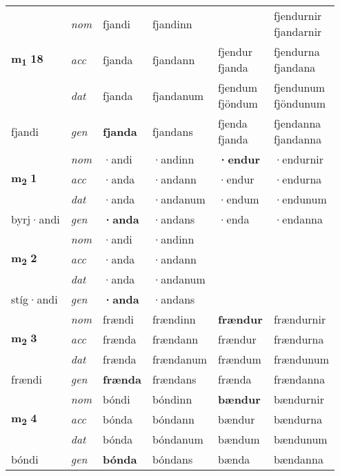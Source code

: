 \begin{longtable}[l]{X>{\footnotesize\itshape}XXXXX}
\multirow{3}{*}{{{\textbf{m{\textsubscript{1}}} \Large{\textbf{18}}}}} & nom & fjandi & fjandinn & \textbf{\specialcell{fjendur\\ fjandar}} & \specialcell{fjendurnir\\ fjandarnir} \\*
 & acc & fjanda & fjandann & \specialcell{fjendur\\ fjanda} & \specialcell{fjendurna\\ fjandana} \\*
 & dat & fjanda & fjandanum & \specialcell{fjendum\\ fjöndum} & \specialcell{fjendunum\\ fjöndunum} \\*
 {\footnotesize{fjandi}} & gen & \textbf{fjanda} & fjandans & \specialcell{fjenda\\ fjanda} & \specialcell{fjendanna\\ fjandanna} \\
\midrule

\multirow{3}{*}{{{\textbf{m{\textsubscript{2}}} \Large{\textbf{1}}}}} & nom & ·andi & ·andinn & \textbf{·endur} & ·endurnir \\*
 & acc & ·anda & ·andann & ·endur & ·endurna \\*
 & dat & ·anda & ·andanum & ·endum & ·endunum \\*
 {\footnotesize{byrj\allowbreak ·andi}} & gen & \textbf{·anda} & ·andans & ·enda & ·endanna \\
\midrule

\multirow{3}{*}{{{\textbf{m{\textsubscript{2}}} \Large{\textbf{2}}}}} & nom & ·andi & ·andinn & \textbf{} &  \\*
 & acc & ·anda & ·andann &  &  \\*
 & dat & ·anda & ·andanum &  &  \\*
 {\footnotesize{stíg\allowbreak ·andi}} & gen & \textbf{·anda} & ·andans &  &  \\
\midrule

\multirow{3}{*}{{{\textbf{m{\textsubscript{2}}} \Large{\textbf{3}}}}} & nom & frændi & frændinn & \textbf{frændur} & frændurnir \\*
 & acc & frænda & frændann & frændur & frændurna \\*
 & dat & frænda & frændanum & frændum & frændunum \\*
 {\footnotesize{frændi}} & gen & \textbf{frænda} & frændans & frænda & frændanna \\
\midrule

\multirow{3}{*}{{{\textbf{m{\textsubscript{2}}} \Large{\textbf{4}}}}} & nom & bóndi & bóndinn & \textbf{bændur} & bændurnir \\*
 & acc & bónda & bóndann & bændur & bændurna \\*
 & dat & bónda & bóndanum & bændum & bændunum \\*
 {\footnotesize{bóndi}} & gen & \textbf{bónda} & bóndans & bænda & bændanna \\
\midrule


\end{longtable}
